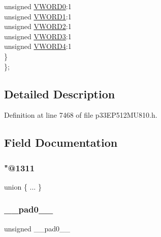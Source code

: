 \begin{DoxyCompactItemize}
\begin{tabbing}
\>\>unsigned \hyperlink{structtag_c_r_c_c_o_n1_b_i_t_s_a478c15a04261460ae4ba2086f8bd2b93}{VWORD0}:1\\
\>\>unsigned \hyperlink{structtag_c_r_c_c_o_n1_b_i_t_s_a1ce4018d0415f1441f3261dd1116d968}{VWORD1}:1\\
\>\>unsigned \hyperlink{structtag_c_r_c_c_o_n1_b_i_t_s_abe082211fb3f854338668319de2ae4af}{VWORD2}:1\\
\>\>unsigned \hyperlink{structtag_c_r_c_c_o_n1_b_i_t_s_ad2a46bc3315db9ed7fc6c98dcd7c9422}{VWORD3}:1\\
\>\>unsigned \hyperlink{structtag_c_r_c_c_o_n1_b_i_t_s_ab3a12f59463b105b67a4f7bc06ed0776}{VWORD4}:1\\
\>\} \\
\}; \\

\end{tabbing}\end{DoxyCompactItemize}


\subsection{Detailed Description}


Definition at line 7468 of file p33\+E\+P512\+M\+U810.\+h.



\subsection{Field Documentation}
\mbox{\label{structtag_c_r_c_c_o_n1_b_i_t_s_aa7c90684407704183e9f377d0960b835}} 
\subsubsection{\texorpdfstring{"@1311}{@1311}}
{\footnotesize\ttfamily union \{ ... \} }

\mbox{\label{structtag_c_r_c_c_o_n1_b_i_t_s_adf71f3d8410c1f1dbbc96680a92c49af}} 
\subsubsection{\texorpdfstring{\+\_\+\+\_\+pad0\+\_\+\+\_\+}{\_\_pad0\_\_}}
{\footnotesize\ttfamily unsigned \+\_\+\+\_\+pad0\+\_\+\+\_\+}



